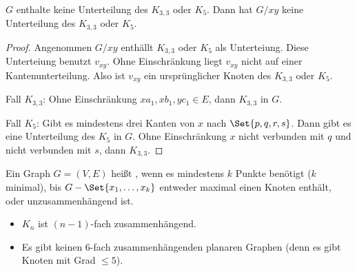 \begin{lem}
    $G$ enthalte keine Unterteilung des $K_{3,3}$ oder $K_5$.
    Dann hat $G / xy$ keine Unterteilung des $K_{3,3}$ oder $K_5$.
    \begin{proof}
        Angenommen $G / xy$ enthällt $K_{3,3}$ oder $K_5$ als Unterteiung.
        Diese Unterteiung benutzt $v_{xy}$.
        Ohne Einschränkung liegt $v_{xy}$ nicht auf einer Kantenunterteilung.
        Also ist $v_{xy}$ ein ursprünglicher Knoten des $K_{3,3}$ oder $K_5$.

        Fall $K_{3,3}$:
        Ohne Einschränkung $xa_1, xb_1, yc_1 \in E$, dann $K_{3,3}$ in $G$.

        Fall $K_5$:
        Gibt es mindestens drei Kanten von $x$ nach $\Set{p,q,r,s}$.
        Dann gibt es eine Unterteilung des $K_5$ in $G$.
        Ohne Einschränkung $x$ nicht verbunden mit $q$ und nicht verbunden mit $s$, dann $K_{3,3}$.
    \end{proof}
\end{lem}

\begin{df}
    Ein Graph $G = (V, E)$ heißt , wenn es mindestens $k$ Punkte benötigt ($k$ minimal), bis $G - \Set{x_1, \dotsc, x_k}$ entweder maximal einen Knoten enthält, oder unzusammenhängend ist.
\end{df}


\begin{nt}
    \begin{itemize}
        \item
            $K_n$ ist $(n-1)$-fach zusammenhängend.
        \item
            Es gibt keinen $6$-fach zusammenhängenden planaren Graphen (denn es gibt Knoten mit Grad $\le 5$).
    \end{itemize}
\end{nt}

